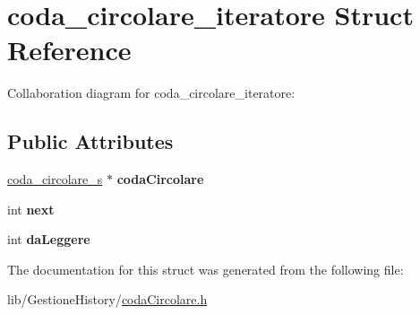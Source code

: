 \hypertarget{structcoda__circolare__iteratore}{}\section{coda\+\_\+circolare\+\_\+iteratore Struct Reference}
\label{structcoda__circolare__iteratore}


Collaboration diagram for coda\+\_\+circolare\+\_\+iteratore\+:
\subsection*{Public Attributes}
\begin{DoxyCompactItemize}
\item 
\mbox{\label{structcoda__circolare__iteratore_a66a33671cbef4ce704c6b8f24633ea34}} 
\hyperlink{structcoda__circolare}{coda\+\_\+circolare\+\_\+s} $\ast$ {\bfseries coda\+Circolare}
\item 
\mbox{\label{structcoda__circolare__iteratore_a93b20c2d2171664c44867bfe40622ad3}} 
int {\bfseries next}
\item 
\mbox{\label{structcoda__circolare__iteratore_a77abeda1e764c6ba0db236b1a0e9728d}} 
int {\bfseries da\+Leggere}
\end{DoxyCompactItemize}


The documentation for this struct was generated from the following file\+:\begin{DoxyCompactItemize}
\item 
lib/\+Gestione\+History/\hyperlink{codaCircolare_8h}{coda\+Circolare.\+h}\end{DoxyCompactItemize}
